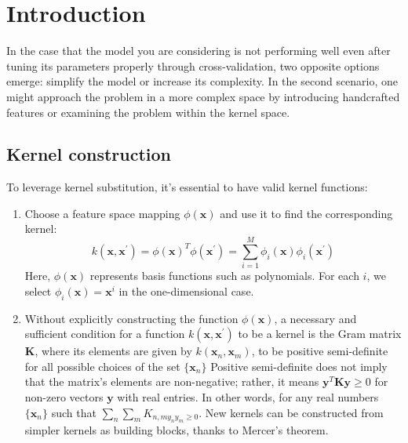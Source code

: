 \section{Introduction}

In the case that the model you are considering is not performing well even after tuning its parameters properly through cross-validation, two opposite options emerge: simplify the model or increase its complexity. 
In the second scenario, one might approach the problem in a more complex space by introducing handcrafted features or examining the problem within the kernel space.

\subsection{Kernel construction}
To leverage kernel substitution, it's essential to have valid kernel functions:
\begin{enumerate}
    \item Choose a feature space mapping $\phi(\mathbf{x})$ and use it to find the corresponding kernel:
        \[k(\mathbf{x},\mathbf{x}^\prime)=\phi(\mathbf{x})^T\phi(\mathbf{x}^\prime)=\sum_{i=1}^M\phi_i(\mathbf{x})\phi_i(\mathbf{x}^\prime)\]
        Here, $\phi(\mathbf{x})$ represents basis functions such as polynomials.
        For each $i$, we select $\phi_i(\mathbf{x})=\mathbf{x}^i$ in the one-dimensional case. 
    \item Without explicitly constructing the function $\phi(\mathbf{x})$, a necessary and sufficient condition for a function $k(\mathbf{x},\mathbf{x}^\prime)$ to be a kernel is the Gram matrix $\mathbf{K}$, where its elements are given by $k(\mathbf{x}_n,\mathbf{x}_m)$, to be positive semi-definite for all possible choices of the set $\{\mathbf{x}_n\}$
        Positive semi-definite does not imply that the matrix's elements are non-negative; rather, it means $\mathbf{y}^T\mathbf{Ky} \geq 0$ for non-zero vectors $\mathbf{y}$ with real entries.
        In other words, for any real numbers $\{\mathbf{x}_n\}$ such that $\sum_n\sum_mK_{n,my_ny_m\geq 0}$.
        New kernels can be constructed from simpler kernels as building blocks, thanks to Mercer's theorem.
\end{enumerate}